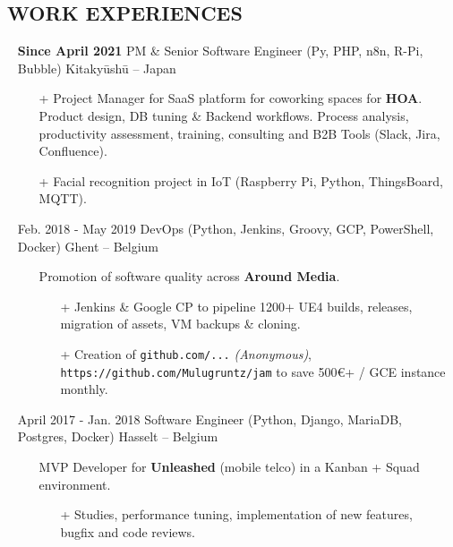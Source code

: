 \documentclass{res}
\begin{document}
\begin{resume}
\pagebreak

\section{\faBriefcase~WORK EXPERIENCES}
        \begin{itemize}
                    \item[] \textbf{Since April 2021} \tabto{5cm} PM \& Senior Software Engineer (Py, PHP, n8n, R-Pi, Bubble) \hfill Kitaky\=ush\=u -- Japan
					\begin{itemize}
                        \item[+] Project Manager for SaaS platform for coworking spaces for \textbf{HOA}. Product design, DB tuning \& Backend workflows. Process analysis, productivity assessment, training, consulting and B2B Tools (Slack, Jira, Confluence).
                        \item[+] Facial recognition project in IoT (Raspberry Pi, Python, ThingsBoard, MQTT).
					\end{itemize}
					\item[] Feb.  2018 - May 2019 \tabto{5cm} DevOps (Python, Jenkins, Groovy, GCP, PowerShell, Docker) \hfill Ghent -- Belgium
					\begin{itemize}
                        \item[] Promotion of software quality across \textbf{Around Media}.
                        \begin{itemize}
                            \item[+] Jenkins \& Google CP to pipeline 1200+ UE4 builds, releases, migration of assets, VM backups \& cloning.
                            \item[+] Creation of \ifisanon \texttt{github.com/...} \textit{(Anonymous)}, \else \texttt{https://github.com/Mulugruntz/jam} \fi to save 500\euro+ / GCE instance monthly.
                        \end{itemize}
					\end{itemize}
					\item[] April 2017 - Jan. 2018 \tabto{5cm} Software Engineer (Python, Django, MariaDB, Postgres, Docker) \hfill Hasselt -- Belgium
					\begin{itemize}
						\item[] MVP Developer for  \textbf{Unleashed} (mobile telco) in a Kanban + Squad environment.
						\begin{itemize}
							\item[+] Studies, performance tuning, implementation of new features, bugfix and code reviews.

\end{itemize}
\end{itemize}
\end{itemize}
\end{resume}
\end{document}
